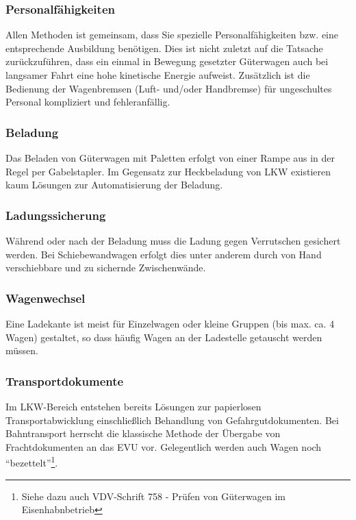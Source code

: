 \subsubsection{Personalfähigkeiten}\label{sec:Personal}
Allen Methoden ist gemeinsam, dass Sie spezielle Personalfähigkeiten bzw. eine entsprechende Ausbildung benötigen. Dies ist nicht zuletzt auf die Tatsache zurückzuführen, dass ein einmal in Bewegung gesetzter Güterwagen auch bei langsamer Fahrt eine hohe kinetische Energie aufweist. Zusätzlich ist die Bedienung der Wagenbremsen (Luft- und/oder Handbremse) für ungeschultes Personal kompliziert und fehleranfällig.
\subsubsection{Beladung}
Das Beladen von Güterwagen mit Paletten erfolgt von einer Rampe aus in der Regel per Gabelstapler. Im Gegensatz zur Heckbeladung von LKW existieren kaum Lösungen zur Automatisierung der Beladung. 
\subsubsection{Ladungssicherung}
Während oder nach der Beladung muss die Ladung gegen Verrutschen gesichert werden. Bei Schiebewandwagen erfolgt dies unter anderem durch von Hand verschiebbare und zu sichernde Zwischenwände.
\subsubsection{Wagenwechsel}
Eine Ladekante ist meist für Einzelwagen oder kleine Gruppen (bis max. ca. 4 Wagen) gestaltet, so dass häufig Wagen an der Ladestelle getauscht werden müssen. %
\subsubsection{Transportdokumente}\label{sec:Transdoc}
Im LKW-Bereich entstehen bereits Lösungen zur papierlosen Transportabwicklung einschließlich Behandlung von Gefahrgutdokumenten. Bei Bahntransport herrscht die klassische Methode der Übergabe von Frachtdokumenten an das \acrshort{EVU} vor. Gelegentlich werden auch Wagen noch "`bezettelt"'\footnote{Siehe dazu auch VDV-Schrift 758 - Prüfen von Güterwagen im Eisenhabnbetrieb}. %

